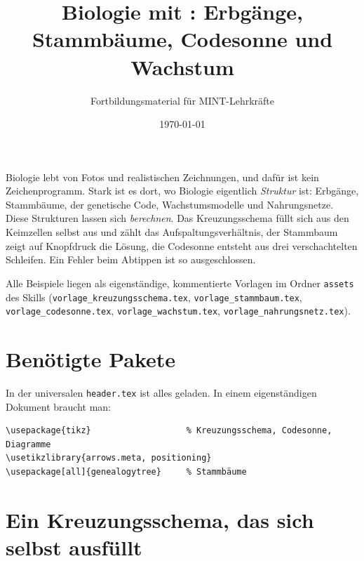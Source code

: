 



\title{Biologie mit : Erbgänge, Stammbäume, Codesonne und Wachstum}
\author{Fortbildungsmaterial für MINT-Lehrkräfte}
\date{\today}
\pagestyle{plain}
\setlength{\parskip}{1.5em} %
\setlength{\emergencystretch}{4em} %




\maketitle

Biologie lebt von Fotos und realistischen Zeichnungen, und dafür ist  kein Zeichenprogramm. Stark ist es dort, wo Biologie eigentlich \textit{Struktur} ist: Erbgänge, Stammbäume, der genetische Code, Wachstumsmodelle und Nahrungsnetze. Diese Strukturen lassen sich \textit{berechnen}. Das Kreuzungsschema füllt sich aus den Keimzellen selbst aus und zählt das Aufspaltungsverhältnis, der Stammbaum zeigt auf Knopfdruck die Lösung, die Codesonne entsteht aus drei verschachtelten Schleifen. Ein Fehler beim Abtippen ist so ausgeschlossen.

Alle Beispiele liegen als eigenständige, kommentierte Vorlagen im Ordner \texttt{assets} des Skills (\texttt{vorlage\_kreuzungsschema.tex}, \texttt{vorlage\_stammbaum.tex}, \texttt{vorlage\_codesonne.tex}, \texttt{vorlage\_wachstum.tex}, \texttt{vorlage\_nahrungsnetz.tex}).

\tableofcontents



\section{Benötigte Pakete}

In der universalen \texttt{header.tex} ist alles geladen. In einem eigenständigen Dokument braucht man:

\begin{lstlisting}[style=latex]
\usepackage{tikz}                   % Kreuzungsschema, Codesonne, Diagramme
\usetikzlibrary{arrows.meta, positioning}
\usepackage[all]{genealogytree}     % Stammbäume
\end{lstlisting}



\section{Ein Kreuzungsschema, das sich selbst ausfüllt}

